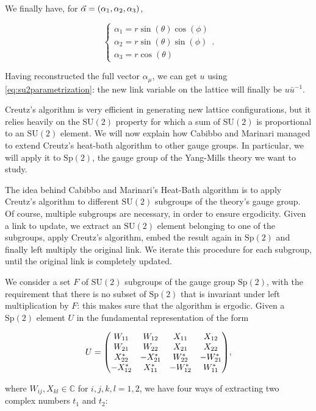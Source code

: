 \documentclass[reqno,12pt]{article}
\numberwithin{equation}{section}
\newcommand{\SU}{\mathrm{SU}}
\newcommand{\Sp}{\mathrm{Sp}}
\begin{document}
We finally have, for $\va{\alpha} = (\alpha_1, \alpha_2, \alpha_3)$,

\begin{equation}
	\begin{cases}
		\alpha_1 = r \sin(\theta) \cos(\phi) \\
		\alpha_2 = r \sin(\theta) \sin(\phi) \\
		\alpha_3 = r \cos(\theta)
	\end{cases}.
\end{equation}

Having reconstructed the full vector $\alpha_\mu$, we can get $u$ using \eqref{eq:su2parametrization}: the new link
variable on the lattice will finally be $u \bar{u}^{-1}$.

Creutz's algorithm is very efficient in generating new lattice configurations, but it relies heavily on the $\SU(2)$
property for which a sum of $\SU(2)$ is proportional to an $\SU(2)$ element. We will now explain how Cabibbo and Marinari
managed to extend Creutz's heat-bath algorithm to other gauge groups. In particular, we will apply it to $\Sp(2)$, the gauge
group of the Yang-Mills theory we want to study.

The idea behind Cabibbo and Marinari's Heat-Bath algorithm is to apply Creutz's algorithm to different $\SU(2)$
subgroups of the theory's gauge group. Of course, multiple subgroups are necessary, in order to ensure ergodicity.
Given a link to update, we extract an $\SU(2)$ element belonging to one of the subgroups, apply Creutz's algorithm,
embed the result again in $\Sp(2)$ and finally left multiply the original link. We iterate this procedure for each
subgroup, until the original link is completely updated. 


We consider a set $F$ of $\SU(2)$ subgroups of the gauge group $\Sp(2)$, with the requirement that there is no subset of $\Sp(2)$
that is invariant under left multiplication by $F$: this makes sure that the algorithm is ergodic.
Given a $\Sp(2)$ element $U$ in the fundamental representation of the form

\begin{equation}
	U = \mqty(
		W_{11} & W_{12} & X_{11} & X_{12} \\
		W_{21} & W_{22} & X_{21} & X_{22} \\
		X^*_{22} & -X^*_{21} & W^*_{22} & -W^*_{21} \\
		-X^*_{12} & X^*_{11} & -W^*_{12} & W^*_{11}
	),
\end{equation}

where $W_{ij}, X_{kl} \in \mathbb{C}$ for $i,j,k,l = 1, 2$, we have four ways of extracting two complex numbers $t_1$ and $t_2$:
\end{document}
